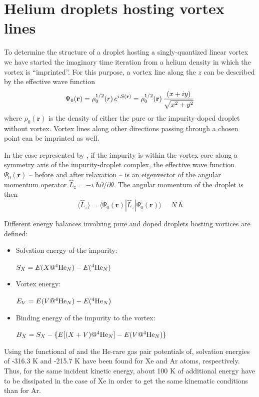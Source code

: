 \section{Helium droplets hosting vortex lines}\label{sec:vtx-lines}

To determine the structure of a droplet hosting a singly-quantized linear vortex 
we have started the imaginary time iteration from a helium  
density in which the vortex is ``imprinted''. For this purpose, a vortex line
along the $z$  can be described by the effective wave function 
%
\begin{equation}
\Psi_0(\mathbf{r}) =  \rho_0^{1/2}(r) \, e^{i  \, {\cal S}(\mathbf{r})} = \rho_0^{1/2}(\mathbf{r}) \, \frac{(x + i y)}{\sqrt{x^2 + y^2}} 
\label{eq11}
\end{equation}
%
where $\rho_0(\mathbf{r})$ is the density of 
either the pure or  the impurity-doped droplet without vortex.  
Vortex lines along other directions passing through a chosen point 
can be imprinted as well\citep{Pi07}.
 
In the case represented by , if the impurity is within the vortex
core along a symmetry axis of the impurity-droplet complex,
the effective wave function $\Psi_0({\mathbf r})$ -- before and after relaxation -- is an eigenvector of the  angular 
momentum operator  $\hat{L}_z = -i \; \hbar \partial/\partial \theta$. 
The angular momentum of the droplet is then
\begin{equation}
\langle \hat{L}_z \rangle = \langle \Psi_0(\mathbf{r}) | \hat{L}_z  | \Psi_0(\mathbf{r}) \rangle = N \; \hbar
\label{eq12}
\end{equation}
%

Different energy balances involving pure and doped droplets 
hosting vortices are defined\citep{Pi07,Anc15,Dal00}:
%
\begin{itemize}
\item
Solvation energy of the impurity:

$ S_X = E(X@^4{\rm He}_N) - E(^4{\rm He}_N)$

\item
Vortex  energy:

$E_V= E(V@^4{\rm He}_N) - E(^4{\rm He}_N)$

\item
Binding energy of the impurity to the vortex: 

$B_X = S_X - \{E[(X+V)@^4{\rm He}_N] - E(V@^4{\rm He}_N)\}$

\end{itemize}
%
Using the functional of and the He-rare gas pair potentials of, solvation energies
of  -316.3 K and -215.7 K have been  found for Xe and Ar atoms, respectively. Thus, for the same incident kinetic
energy, about 100 K of additional energy have to be dissipated in the case of Xe in order to get the same kinematic conditions than for Ar.

